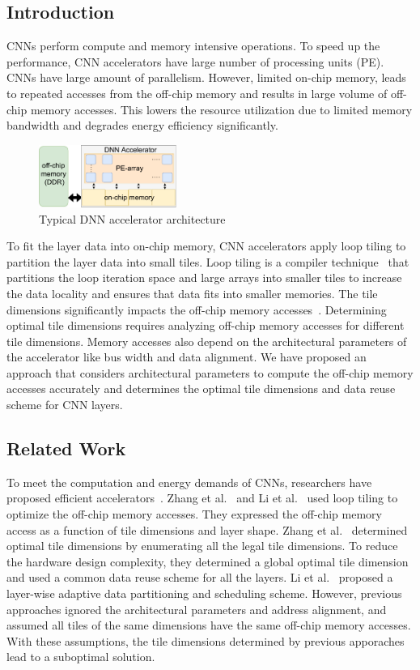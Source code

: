 \documentclass[a4paper,10pt]{article}
\begin{document}
\subsection{Introduction}
CNNs perform compute and memory intensive operations.  To speed up the performance, CNN accelerators have large number of processing units (PE). 
CNNs have large amount of parallelism. However, limited on-chip memory, leads to repeated accesses from the off-chip memory and results in large volume of off-chip memory accesses. This lowers the resource utilization due to limited memory bandwidth and degrades energy efficiency significantly. 
\begin{figure}[!htb]
	\centering
	\includegraphics[width=0.4\textwidth]{DNNAccelerator}
	\caption{Typical DNN accelerator architecture}
	\label{fig:dnnAccelerator}
\end{figure}
To fit the layer data into on-chip memory, CNN accelerators apply loop tiling to partition the layer data into small tiles. Loop tiling is a compiler  technique~\cite{aho2006compilers} that partitions the loop iteration space and large arrays into smaller tiles to increase the data locality and ensures that data fits into smaller memories. The tile dimensions significantly impacts the off-chip memory accesses~\cite{zhang2015optimizing, Li2018SmartShuttleOO}. 
Determining optimal tile dimensions requires analyzing off-chip memory accesses for different tile dimensions. Memory accesses also depend on the architectural parameters of the accelerator like bus width and data alignment. We have proposed an approach that considers architectural parameters to compute the off-chip memory accesses accurately and determines the optimal tile dimensions and data reuse scheme for CNN layers.
\subsection{Related Work}
To meet the computation and energy demands of CNNs, researchers have proposed efficient accelerators~\cite{gokhale2014240,8742284,alwani2016fused, Chen2016EyerissAS}. Zhang et al.~\cite{zhang2015optimizing} and Li et al.~\cite{Li2018SmartShuttleOO} used loop tiling to optimize the off-chip memory accesses. They expressed the off-chip memory access as a function of tile dimensions and layer shape. Zhang et al.~\cite{zhang2015optimizing} determined optimal tile dimensions by enumerating all the legal tile dimensions. To reduce the hardware design complexity, they determined a global optimal tile dimension and used a common data reuse scheme for all the layers. Li et al.~\cite{Li2018SmartShuttleOO} proposed a layer-wise adaptive data partitioning and scheduling scheme. However, previous approaches ignored the architectural parameters and address alignment, and assumed all tiles of the same dimensions have the same off-chip memory accesses. With these assumptions, the tile dimensions determined by previous apporaches lead to a suboptimal solution.
\end{document}
